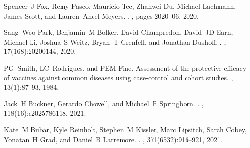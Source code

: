 \documentclass[12pt]{article}
\begin{document}
\begin{thebibliography}{10}
Spencer~J Fox, Remy Pasco, Mauricio Tec, Zhanwei Du, Michael Lachmann, James
  Scott, and Lauren~Ancel Meyers.
.
, pages 2020--06, 2020.

Sang~Woo Park, Benjamin~M Bolker, David Champredon, David~JD Earn, Michael Li,
  Joshua~S Weitz, Bryan~T Grenfell, and Jonathan Dushoff.
.
, 17(168):20200144, 2020.

PG~Smith, LC~Rodrigues, and PEM Fine.
\newblock Assessment of the protective efficacy of vaccines against common
  diseases using case-control and cohort studies.
, 13(1):87--93, 1984.

Jack~H Buckner, Gerardo Chowell, and Michael~R Springborn.
.
,
  118(16):e2025786118, 2021.

Kate~M Bubar, Kyle Reinholt, Stephen~M Kissler, Marc Lipsitch, Sarah Cobey,
  Yonatan~H Grad, and Daniel~B Larremore.
.
, 371(6532):916--921, 2021.

\end{thebibliography}
\end{document}
